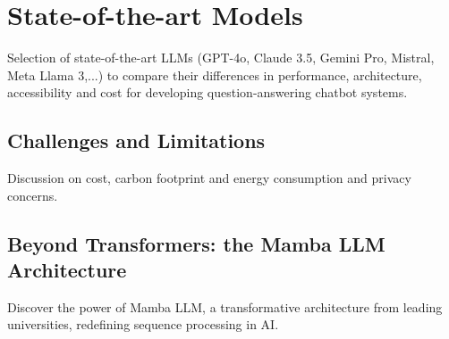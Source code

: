 \section{State-of-the-art Models}
Selection of state-of-the-art LLMs (GPT-4o, Claude 3.5, Gemini Pro, Mistral, Meta Llama 3,...) to compare their differences in performance, architecture, accessibility and cost for developing question-answering chatbot systems.

\subsection{Challenges and Limitations}
Discussion on cost, carbon footprint and energy consumption and privacy concerns.

\subsection{Beyond Transformers: the Mamba LLM Architecture}
Discover the power of Mamba LLM, a transformative architecture from leading universities, redefining sequence processing in AI.

